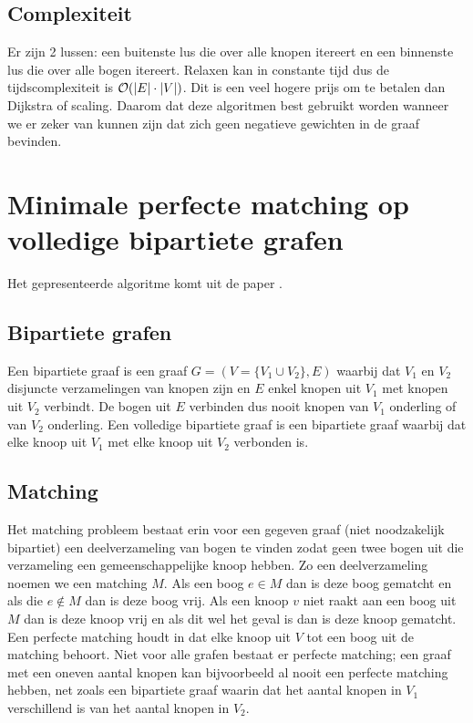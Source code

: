\documentclass[conference]{IEEEtran}
\theoremstyle{definition}
\theoremstyle{remark}
\DeclarePairedDelimiter{\card}{\vert}{\vert}  %
\begin{document}
\subsection{Complexiteit}
Er zijn 2 lussen: een buitenste lus die over alle knopen itereert en een binnenste lus die over alle bogen itereert. Relaxen kan in constante tijd dus de tijdscomplexiteit is $\mathcal{O}(\card{E} \cdot \card{V})$. Dit is een veel hogere prijs om te betalen dan Dijkstra of scaling. Daarom dat deze algoritmen best gebruikt worden wanneer we er zeker van kunnen zijn dat zich geen negatieve gewichten in de graaf bevinden.


\section{Minimale perfecte matching op volledige bipartiete grafen}
Het gepresenteerde algoritme komt uit de paper  \cite{FasterScaling}.

\subsection{Bipartiete grafen}
Een bipartiete graaf is een graaf $G = (V = \{V_1 \cup V_2\}, E)$ waarbij dat $V_1$ en $V_2$ disjuncte verzamelingen van knopen zijn en $E$ enkel knopen uit $V_1$ met knopen uit $V_2$ verbindt. De bogen uit $E$ verbinden dus nooit knopen van $V_1$ onderling of van $V_2$ onderling. Een volledige bipartiete graaf is een bipartiete graaf waarbij dat elke knoop uit $V_1$ met elke knoop uit $V_2$ verbonden is.

\subsection{Matching}
Het matching probleem bestaat erin voor een gegeven graaf (niet noodzakelijk bipartiet) een deelverzameling van bogen te vinden zodat geen twee bogen uit die verzameling een gemeenschappelijke knoop hebben. Zo een deelverzameling noemen we een matching $M$. Als een boog $e \in M$ dan is deze boog gematcht en als die $e \notin M$ dan is deze boog vrij. Als een knoop $v$ niet raakt aan een boog uit $M$ dan is deze knoop vrij en als dit wel het geval is dan is deze knoop gematcht. Een perfecte matching houdt in dat elke knoop uit $V$ tot een boog uit de matching behoort. Niet voor alle grafen bestaat er perfecte matching; een graaf met een oneven aantal knopen kan bijvoorbeeld al nooit een perfecte matching hebben, net zoals een bipartiete graaf waarin dat het aantal knopen in $V_1$ verschillend is van het aantal knopen in $V_2$.
\end{document}
